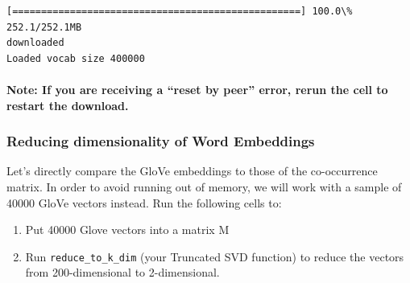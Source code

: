 \documentclass[11pt]{article}
\providecommand{\tightlist}{%
      \setlength{\itemsep}{0pt}\setlength{\parskip}{0pt}}
\begin{document}
    \begin{Verbatim}[commandchars=\\\{\}]
[==================================================] 100.0\% 252.1/252.1MB
downloaded
Loaded vocab size 400000
    \end{Verbatim}

    \paragraph{Note: If you are receiving a ``reset by peer'' error, rerun
the cell to restart the
download.}\label{note-if-you-are-receiving-a-reset-by-peer-error-rerun-the-cell-to-restart-the-download.}

    \subsubsection{Reducing dimensionality of Word
Embeddings}\label{reducing-dimensionality-of-word-embeddings}

Let's directly compare the GloVe embeddings to those of the
co-occurrence matrix. In order to avoid running out of memory, we will
work with a sample of 40000 GloVe vectors instead. Run the following
cells to:

\begin{enumerate}
\def\labelenumi{\arabic{enumi}.}
\tightlist
\item
  Put 40000 Glove vectors into a matrix M
\item
  Run \texttt{reduce\_to\_k\_dim} (your Truncated SVD function) to
  reduce the vectors from 200-dimensional to 2-dimensional.
\end{enumerate}
\end{document}
